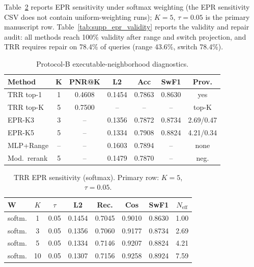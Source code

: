 \documentclass[journal,10pt]{IEEEtran}
\begin{document}
Table~\ref{tab:supp_epr_sensitivity} reports EPR sensitivity under softmax weighting (the EPR sensitivity CSV does not contain uniform-weighting runs); $K=5$, $\tau=0.05$ is the primary manuscript row. Table~\ref{tab:supp_epr_validity} reports the validity and repair audit: all methods reach 100\% validity after range and switch projection, and TRR requires repair on 78.4\% of queries (range 43.6\%, switch 78.4\%).

\begin{table}[htbp]
\centering
\caption{Protocol-B executable-neighborhood diagnostics.}
\label{tab:executable_neighborhood_supp}
\footnotesize
\setlength{\tabcolsep}{2.8pt}
\begin{tabular}{lcccccc}
\toprule
\textbf{Method} & \textbf{K} & \textbf{PNR@K} & \textbf{L2} & \textbf{Acc} & \textbf{SwF1} & \textbf{Prov.} \\
\midrule
TRR top-1 & 1 & 0.4608 & 0.1454 & 0.7863 & 0.8630 & yes \\
TRR top-K & 5 & 0.7500 & -- & -- & -- & top-K \\
EPR-K3 & 3 & -- & 0.1356 & 0.7872 & 0.8734 & 2.69/0.47 \\
EPR-K5 & 5 & -- & 0.1334 & 0.7908 & 0.8824 & 4.21/0.34 \\
MLP+Range & -- & -- & 0.1603 & 0.7894 & -- & none \\
Mod.\ rerank & 5 & -- & 0.1479 & 0.7870 & -- & neg. \\
\bottomrule
\end{tabular}
\end{table}

\begin{table}[htbp]
\centering
\caption{TRR EPR sensitivity (softmax). Primary row: $K=5$, $\tau=0.05$.}
\label{tab:supp_epr_sensitivity}
\footnotesize
\setlength{\tabcolsep}{2.8pt}
\begin{tabular}{lccccccc}
\toprule
\textbf{W} & \textbf{$K$} & \textbf{$\tau$} & \textbf{L2} & \textbf{Rec.} & \textbf{Cos} & \textbf{SwF1} & \textbf{$N_{\mathrm{eff}}$} \\
\midrule
softm. & 1 & 0.05 & 0.1454 & 0.7045 & 0.9010 & 0.8630 & 1.00 \\
softm. & 3 & 0.05 & 0.1356 & 0.7060 & 0.9177 & 0.8734 & 2.69 \\
softm. & 5 & 0.05 & 0.1334 & 0.7146 & 0.9207 & 0.8824 & 4.21 \\
softm. & 10 & 0.05 & 0.1307 & 0.7156 & 0.9258 & 0.8924 & 7.59 \\
\bottomrule
\end{tabular}
\end{table}
\end{document}

